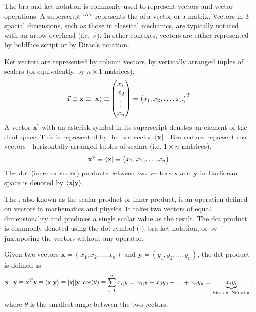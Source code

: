 The bra and ket notation is commonly used to represent vectors and vector operations. A superscript ``$^T$'' represents the  of a vector or a matrix. Vectors in 3 spacial dimensions, such as those in classical mechanics, are typically notated with an arrow overhead (i.e. $\vec{v}$). In other contexts, vectors are either represented by boldface script or by Dirac's  notation. 

\begin{defn}{1}
	Ket vectors are represented by column vectors, by vertically arranged tuples of scalers (or equivalently, by $n \times 1$ matrices).
	\begin{align}
		\vec{x} \equiv \mathbf{x} \equiv \ket{\mathbf{x}} \equiv \left(\begin{matrix}
			x_1 \\ x_2 \\ \vdots \\ x_n
		\end{matrix}\right) = \left(\begin{matrix}
		x_1, x_2, \hdots, x_n
	\end{matrix}\right)^T
	\end{align}
	A vector $\mathbf{x}^*$ with an asterisk symbol in its superscript denotes an element of the dual space. This is represented by the bra vector $\bra{\mathbf{x}}$ . Bra vectors represent row vectors - horizontally arranged tuples of scalars (i.e. $1 \times n$ matrices).
		\begin{align}
		\mathbf{x}^* \equiv \bra{\mathbf{x}} \equiv \left(\begin{matrix}
			x_1, x_2, \hdots, x_n
		\end{matrix}\right)
	\end{align}
	The dot (inner or scaler) products between two vectors $\mathbf{x}$ and $\mathbf{y}$ in Euclidean space is denoted by $\braket{\mathbf{x}|\mathbf{y}}$.
\end{defn}

The , also known as the scalar product or inner product, is an operation defined on vectors in mathematics and physics. It takes two vectors of equal dimensionality and produces a single scalar value as the result. The dot product is commonly denoted using the dot symbol ($\cdot$), bra-ket notation, or by juxtaposing the vectors without any operator.

\begin{defn}{1}
	Given two vectors $\mathbf{x}=(x_1, x_2, \hdots, x_n)$ and $\mathbf{y}=(y_1, y_2, \hdots, y_n)$, the dot product is defined as
	\begin{align}
		\mathbf{x}\cdot\mathbf{y} \equiv \mathbf{x}^T\mathbf{y} \equiv \braket{\mathbf{x}|\mathbf{y}} \equiv |\mathbf{x}||\mathbf{y}|\cos(\theta) \equiv \sum_{i=1}^{n} x_iy_i = x_1y_1 + x_2y_2 + \hdots + x_ny_n = \underbrace{x_iy_i}_{\text{Einstein Notation}},
	\end{align}
	where $\theta$ is the smallest angle between the two vectors.
\end{defn}

